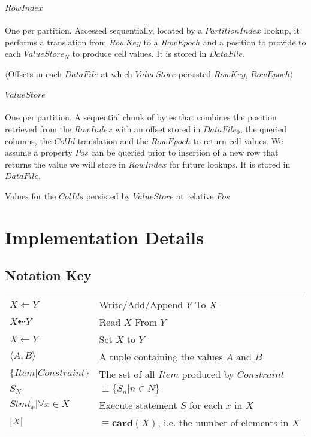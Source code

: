 \documentclass[fleqn]{article}
\begin{document}
\subparagraph{$RowIndex$}
\subparagraph{}
    One per partition. Accessed sequentially, located by a $PartitionIndex$ lookup, it performs 
    a translation from $RowKey$ to a $RowEpoch$ and a position to provide to each $ValueStore_N$
    to produce cell values. It is stored in $DataFile$.
    \\
    \begin{algorithmic}[2]
    \scriptsize
    \Statex \Return $\langle$Offsets in each $DataFile$ at which $ValueStore$ persisted $RowKey$, $RowEpoch \rangle$
    \EndFunction
    \end{algorithmic}

\subparagraph{$ValueStore$}
\subparagraph{}
    One per partition. A sequential chunk of bytes that combines the position retrieved
    from the $RowIndex$ with an offset stored in $DataFile_0$, the queried columns, the $ColId$ translation
    and the $RowEpoch$ to return cell values. We assume a property $Pos$ can be queried prior to insertion
    of a new row that returns the value we will store in $RowIndex$ for future lookups. It is stored in $DataFile$.
    \\
    \begin{algorithmic}[2]
    \scriptsize
    \Statex \Return Values for the $ColIds$ persisted by $ValueStore$ at relative $Pos$
    \EndFunction
    \end{algorithmic}


\section{Implementation Details}
\subsection{Notation Key}
\paragraph{}
\begin{tabular}{l l}
$X \Leftarrow Y$ & Write/Add/Append $Y$ To $X$\\
$X \dashleftarrow Y$ & Read $X$ From $Y$\\
$X \gets Y$ & Set $X$ to $Y$\\
$\langle A,B \rangle$ & A tuple containing the values $A$ and $B$\\
$\{Item | Constraint\}$ & The set of all $Item$ produced by $Constraint$\\
$S_N$ & $\equiv \{S_n | n \in N\}$\\
$Stmt_x | \forall x \in X$ & Execute statement $S$ for each $x$ in $X$\\
$\lvert X \rvert$ & $\equiv \mathbf{card}(X)$, i.e. the number of elements in $X$\\
\end{tabular}
\end{document}

